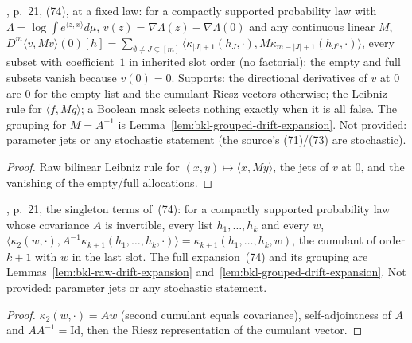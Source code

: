 \begin{lemma}
  \label{lem:bkl-raw-drift-expansion}
  \leanok
  \cite{BizeulKlartagLehec2026}, p.~21, (74), at a fixed law: for a compactly supported probability law with
  $\Lambda=\log\int e^{\langle z,x\rangle}d\mu$, $v(z)=\nabla\Lambda(z)-\nabla\Lambda(0)$ and any continuous linear $M$,
  $D^m\langle v,Mv\rangle(0)[h]=\sum_{\emptyset\ne J\subsetneq[m]}\langle\kappa_{|J|+1}(h_J,\cdot),
  M\kappa_{m-|J|+1}(h_{J^c},\cdot)\rangle$, every subset with coefficient~$1$ in inherited slot order (no factorial);
  the empty and full subsets vanish because $v(0)=0$.  Supports: the directional derivatives of $v$ at $0$ are $0$ for
  the empty list and the cumulant Riesz vectors otherwise; the Leibniz rule for $\langle f,Mg\rangle$; a Boolean mask
  selects nothing exactly when it is all false.  The grouping for $M=A^{-1}$ is
  Lemma~\ref{lem:bkl-grouped-drift-expansion}.  Not provided: parameter jets or any stochastic statement (the
  source's (71)/(73) are stochastic).
\end{lemma}
\begin{proof}
  \leanok
  Raw bilinear Leibniz rule for $(x,y)\mapsto\langle x,My\rangle$, the jets of $v$ at $0$, and the vanishing of the
  empty/full allocations.
\end{proof}

\begin{lemma}
  \label{lem:bkl-singleton-allocation}
  \leanok
  \cite{BizeulKlartagLehec2026}, p.~21, the singleton terms of~(74): for a compactly supported probability law whose
  covariance $A$ is invertible, every list $h_1,\dots,h_k$ and every $w$,
  $\langle\kappa_2(w,\cdot),A^{-1}\kappa_{k+1}(h_1,\dots,h_k,\cdot)\rangle=\kappa_{k+1}(h_1,\dots,h_k,w)$, the cumulant of
  order $k+1$ with $w$ in the last slot.  The full expansion~(74) and its grouping are
  Lemmas~\ref{lem:bkl-raw-drift-expansion} and~\ref{lem:bkl-grouped-drift-expansion}.  Not provided: parameter jets
  or any stochastic statement.
\end{lemma}
\begin{proof}
  \leanok
  $\kappa_2(w,\cdot)=Aw$ (second cumulant equals covariance), self-adjointness of $A$ and $AA^{-1}=\mathrm{Id}$, then the
  Riesz representation of the cumulant vector.
\end{proof}

